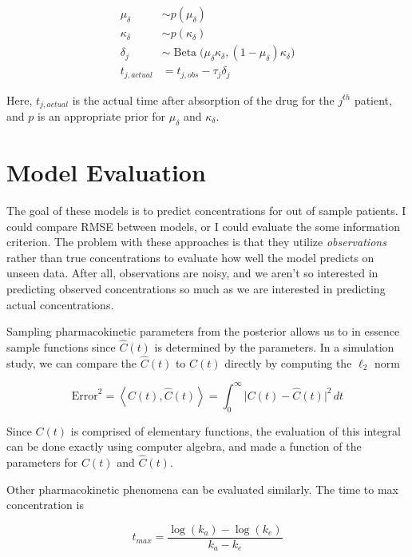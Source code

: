 \documentclass[12pt,a4paper]{book}
\begin{document}
 \begin{align}
	\mu_{\delta} &\sim p(\mu_{\delta})\\
	\kappa_{\delta} &\sim p(\kappa_{\delta})\\
	\delta_j &\sim \operatorname{Beta}\Big(\mu_{\delta}\kappa_{\delta}, (1-\mu_{\delta})\kappa_{\delta}\Big)\\
	t_{j,actual} &= t_{j,obs} - \tau_j\delta_j
 \end{align}
 
 \noindent Here, $ t_{j, actual} $ is the actual time after absorption of the drug for the $ j^{th} $ patient, and  $p$ is an appropriate prior for $ \mu_{\delta} $ and $ \kappa_{\delta} $.


\section{Model Evaluation}

The goal of these models is to predict concentrations for out of sample patients.  I could compare RMSE between models, or I could evaluate the some information criterion.  The problem with these approaches is that they utilize \textit{observations} rather than true concentrations to evaluate how well the model predicts on unseen data.  After all, observations are noisy, and we aren't so interested in predicting observed concentrations so much as we are interested in predicting actual concentrations.

Sampling pharmacokinetic parameters from the posterior allows us to in essence sample functions since $ \hat{C}(t) $ is determined by the parameters. In a simulation study, we can compare the $ \hat{C}(t) $ to $ C(t) $ directly by computing the $ \ell_2 $ norm

\begin{equation}
 \mbox{Error}^2 = \left<C(t), \hat{C}(t)\right> = \int_{0}^\infty \lvert  C(t) - \hat{C}(t)\rvert^2 \, dt
\end{equation}

\noindent Since $ C(t) $ is comprised of elementary functions, the evaluation of this integral can be done exactly using computer algebra, and made a function of the parameters for $ C(t) $ and $ \hat{C}(t) $.

Other pharmacokinetic phenomena can be evaluated similarly.  The time to max concentration is 


\begin{equation}
t_{max} = \dfrac{\log(k_a) - \log(k_e)}{k_a - k_e}
\end{equation}
\end{document}
